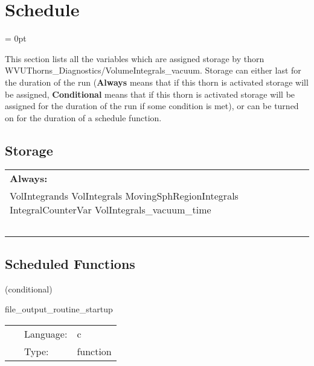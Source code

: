 
\section{Schedule} 


\parskip = 0pt


\noindent This section lists all the variables which are assigned storage by thorn WVUThorns\_Diagnostics/VolumeIntegrals\_vacuum.  Storage can either last for the duration of the run ({\bf Always} means that if this thorn is activated storage will be assigned, {\bf Conditional} means that if this thorn is activated storage will be assigned for the duration of the run if some condition is met), or can be turned on for the duration of a schedule function.


\subsection*{Storage}

\hspace{5mm}

 \begin{tabular*}{160mm}{ll} 

{\bf Always:}&  ~ \\ 
 VolIntegrands VolIntegrals MovingSphRegionIntegrals IntegralCounterVar VolIntegrals\_vacuum\_time & ~\\ 
~ & ~\\ 
\end{tabular*} 


\subsection*{Scheduled Functions}
\vspace{5mm}

   (conditional) 

\hspace{5mm} file\_output\_routine\_startup 

\hspace{5mm}{\it create directory for file output. } 


\hspace{5mm}

 \begin{tabular*}{160mm}{cll} 
~ & Language:  & c \\ 
~ & Type:  & function \\ 
\end{tabular*} 


\vspace{5mm}

